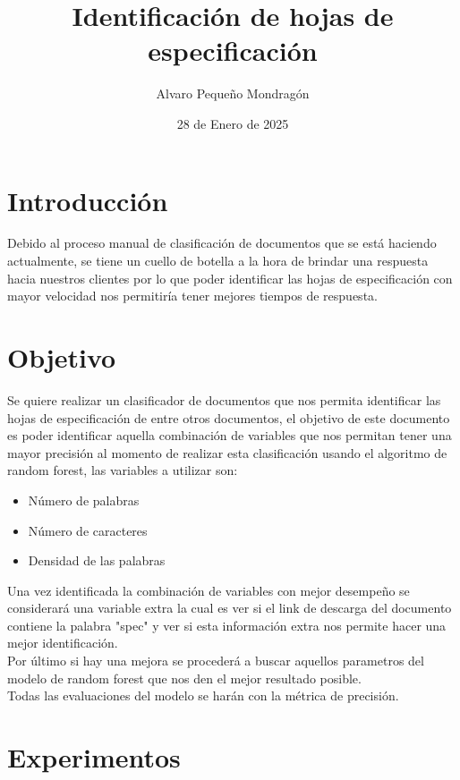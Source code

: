 \documentclass{article}
\title{\textbf{Identificación de hojas de especificación}}
\author{Alvaro Pequeño Mondragón}
\date{28 de Enero de 2025}
\begin{document}
	
	\maketitle
	
	\section*{Introducción}
	
	Debido al proceso manual de clasificación de documentos que se está haciendo actualmente, se tiene un cuello de botella a la hora de brindar una respuesta hacia nuestros clientes por lo que poder identificar las hojas de especificación con mayor velocidad nos permitiría tener mejores tiempos de respuesta.
	
	\section*{Objetivo}
	
	Se quiere realizar un clasificador de documentos que nos permita identificar las hojas de especificación de entre otros documentos, el objetivo de este documento es poder identificar aquella combinación de variables que nos permitan tener una mayor precisión al momento de realizar esta clasificación usando el algoritmo de random forest, las variables a utilizar son:
	
	\begin{itemize}
		\item Número de palabras
		\item Número de caracteres
		\item Densidad de las palabras
	\end{itemize}
	
	Una vez identificada la combinación de variables con mejor desempeño se considerará una variable extra la cual es ver si el link de descarga del documento contiene la palabra "spec" y ver si esta información extra nos permite hacer una mejor identificación.\\
	
	Por último si hay una mejora se procederá a buscar aquellos parametros del modelo de random forest que nos den el mejor resultado posible.\\
	
	Todas las evaluaciones del modelo se harán con la métrica de precisión.
	
	\section*{Experimentos} 
	
\end{document}
